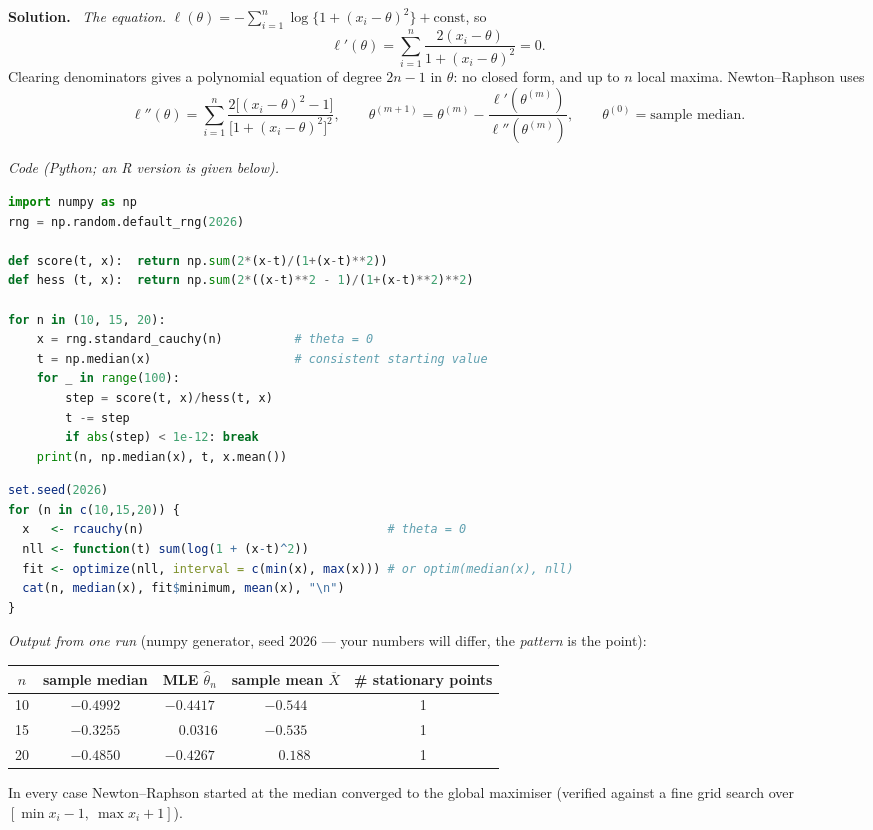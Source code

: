 \documentclass[11pt]{article}
\newcommand{\Xbar}{\overline{X}}
\newcommand{\soln}{\medskip\noindent\textbf{Solution.}\ }
\begin{document}
\soln
\emph{The equation.} $\displaystyle\ell(\theta)=-\sum_{i=1}^n\log\{1+(x_i-\theta)^2\}+\text{const}$, so
\[
\ell'(\theta)=\sum_{i=1}^n\frac{2(x_i-\theta)}{1+(x_i-\theta)^2}=0 .
\]
Clearing denominators gives a polynomial equation of degree $2n-1$ in $\theta$: no closed form,
and up to $n$ local maxima. Newton--Raphson uses
\[
\ell''(\theta)=\sum_{i=1}^n\frac{2\big[(x_i-\theta)^2-1\big]}{\big[1+(x_i-\theta)^2\big]^2},
\qquad
\theta^{(m+1)}=\theta^{(m)}-\frac{\ell'(\theta^{(m)})}{\ell''(\theta^{(m)})},
\qquad \theta^{(0)}=\text{sample median}.
\]

\emph{Code (Python; an R version is given below).}
\begin{lstlisting}[language=Python]
import numpy as np
rng = np.random.default_rng(2026)

def score(t, x):  return np.sum(2*(x-t)/(1+(x-t)**2))
def hess (t, x):  return np.sum(2*((x-t)**2 - 1)/(1+(x-t)**2)**2)

for n in (10, 15, 20):
    x = rng.standard_cauchy(n)          # theta = 0
    t = np.median(x)                    # consistent starting value
    for _ in range(100):
        step = score(t, x)/hess(t, x)
        t -= step
        if abs(step) < 1e-12: break
    print(n, np.median(x), t, x.mean())
\end{lstlisting}

\begin{lstlisting}[language=R]
set.seed(2026)
for (n in c(10,15,20)) {
  x   <- rcauchy(n)                                  # theta = 0
  nll <- function(t) sum(log(1 + (x-t)^2))
  fit <- optimize(nll, interval = c(min(x), max(x))) # or optim(median(x), nll)
  cat(n, median(x), fit$minimum, mean(x), "\n")
}
\end{lstlisting}

\emph{Output from one run} (numpy generator, seed 2026 --- your numbers will differ, the
\emph{pattern} is the point):
\begin{center}
\renewcommand{\arraystretch}{1.25}
\begin{tabular}{@{}ccccc@{}}
\toprule
$n$ & sample median & MLE $\hat\theta_n$ & sample mean $\Xbar$ & \# stationary points \\
\midrule
10 & $-0.4992$ & $-0.4417$ & $-0.544$ & 1 \\
15 & $-0.3255$ & $\phantom{-}0.0316$ & $-0.535$ & 1 \\
20 & $-0.4850$ & $-0.4267$ & $\phantom{-}0.188$ & 1 \\
\bottomrule
\end{tabular}
\end{center}
In every case Newton--Raphson started at the median converged to the global maximiser (verified
against a fine grid search over $[\min x_i-1,\ \max x_i+1]$).
\end{document}
